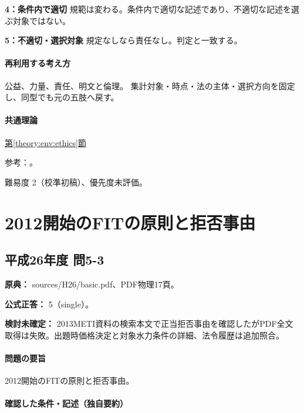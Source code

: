 \noindent\textbf{4：条件内で適切} 規範は変わる。条件内で適切な記述であり、不適切な記述を選ぶ対象ではない。\par

\noindent\textbf{5：不適切・選択対象} 規定なしなら責任なし。判定と一致する。\par

\paragraph{再利用する考え方} 公益、力量、責任、明文と倫理。 集計対象・時点・法の主体・選択方向を固定し、同型でも元の五肢へ戻す。

\paragraph{共通理論} \hyperref[theory:env:ethics]{第\ref*{theory:env:ethics}節}

\par 参考：\cite{ipej_ethics2011}。

\par 難易度 2（校準初稿）、優先度未評価。

\section{2012開始のFITの原則と拒否事由}

\subsection{平成26年度 問5-3}
\label{q:h26-reg-basic-5-3}

\noindent\textbf{原典：} sources/H26/basic.pdf、PDF物理17頁。

\textbf{公式正答：} 5（single）。

\par\textbf{検討未確定：} 2013METI資料の検索本文で正当拒否事由を確認したがPDF全文取得は失敗。出題時価格決定と対象水力条件の詳細、法令履歴は追加照合。

\paragraph{問題の要旨} 2012開始のFITの原則と拒否事由。

\paragraph{確認した条件・記述（独自要約）}\mbox{}\par

